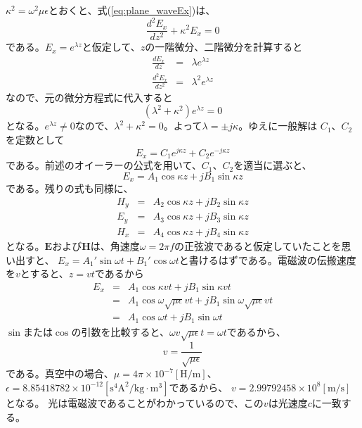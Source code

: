 $\kappa^2=\omega^2\mu\epsilon$とおくと、式(\ref{eq:plane_waveEx})は、
\[
\frac{d^2E_x}{dz^2} + \kappa^2 E_x = 0
\]
である。$E_x=e^{\lambda z}$と仮定して、$z$の一階微分、二階微分を計算すると
\begin{eqnarray*}
\frac{dE_x}{dz} &=& \lambda e^{\lambda z}\\
\frac{d^2E_x}{dz^2} &=& \lambda^2 e^{\lambda z}
\end{eqnarray*}
なので、元の微分方程式に代入すると
\[
(\lambda^2 + \kappa^2)e^{\lambda z} = 0
\]
となる。$e^{\lambda z} \neq 0$なので、$\lambda^2 + \kappa^2 = 0$。よって$\lambda=\pm j\kappa$。ゆえに一般解は
$C_1$、$C_2$を定数として
\[
E_x = C_1 e^{j\kappa z} + C_2 e^{-j\kappa z}
\]
である。前述のオイーラーの公式を用いて、$C_1$、$C_2$を適当に選ぶと、
\begin{equation}
E_x = A_1\cos\kappa z + jB_1\sin\kappa z
\end{equation}
である。残りの式も同様に、
\begin{eqnarray}
H_y &=& A_2\cos\kappa z + jB_2\sin\kappa z \\
E_y &=& A_3\cos\kappa z + jB_3\sin\kappa z \\
H_x &=& A_4\cos\kappa z + jB_4\sin\kappa z
\end{eqnarray}
となる。$\bm{E}$および$\bm{H}$は、角速度$\omega = 2\pi f$の正弦波であると仮定していたことを思い出すと、
$E_x = A_1'\sin \omega t + B_1' \cos \omega t$と書けるはずである。電磁波の伝搬速度を$v$とすると、$z=vt$であるから
\begin{eqnarray*}
E_x &=& A_1\cos \kappa vt + jB_1 \sin \kappa vt \\
&=& A_1\cos \omega \sqrt{\mu \epsilon}vt + jB_1\sin \omega \sqrt{\mu \epsilon}vt\\
&=&  A_1\cos \omega t + jB_1 \sin \omega t
\end{eqnarray*}
$\sin$または$\cos$の引数を比較すると、$\omega v\sqrt{\mu \epsilon} t= \omega t$であるから、
\begin{equation}
v = \frac{1}{\sqrt{\mu \epsilon}}
\end{equation}
である。真空中の場合、$\mu = 4\pi \times 10^{-7}\mathrm{[H/m]}$、$\epsilon =8.85418782 \times 10^{-12} \mathrm{[s^4A^2/kg\cdot m^3]}$であるから、
$v=2.99792458\times 10^8 \mathrm{[m/s]}$となる。
光は電磁波であることがわかっているので、この$v$は光速度$c$に一致する。

